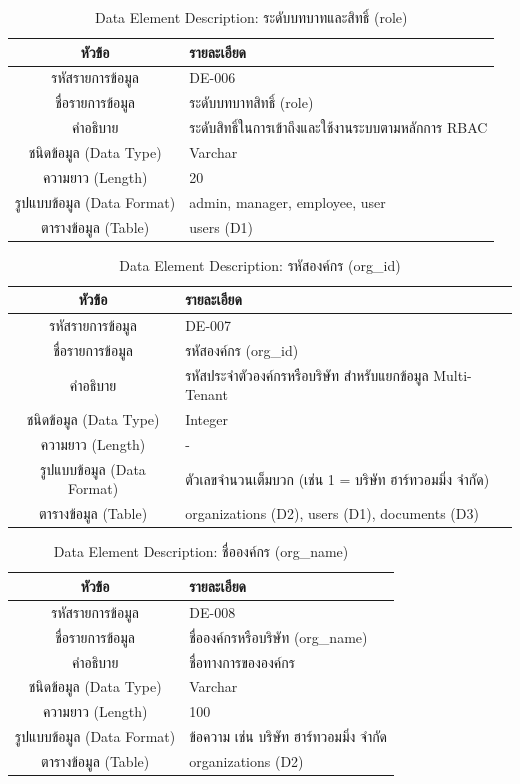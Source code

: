 \begin{table}[htbp]
\centering
\caption{Data Element Description: ระดับบทบาทและสิทธิ์ (role)}
\label{tab3:de_role}
\begin{tabularx}{\textwidth}{| c | L |}
\hline
\textbf{หัวข้อ} & \textbf{รายละเอียด} \\ \hline
รหัสรายการข้อมูล & DE-006 \\ \hline
ชื่อรายการข้อมูล & ระดับบทบาทสิทธิ์ (role) \\ \hline
คำอธิบาย & ระดับสิทธิ์ในการเข้าถึงและใช้งานระบบตามหลักการ RBAC \\ \hline
ชนิดข้อมูล (Data Type) & Varchar \\ \hline
ความยาว (Length) & 20 \\ \hline
รูปแบบข้อมูล (Data Format) & admin, manager, employee, user \\ \hline
ตารางข้อมูล (Table) & users (D1) \\ \hline
\end{tabularx}
\end{table}

\begin{table}[htbp]
\centering
\caption{Data Element Description: รหัสองค์กร (org\_id)}
\label{tab3:de_org_id}
\begin{tabularx}{\textwidth}{| c | L |}
\hline
\textbf{หัวข้อ} & \textbf{รายละเอียด} \\ \hline
รหัสรายการข้อมูล & DE-007 \\ \hline
ชื่อรายการข้อมูล & รหัสองค์กร (org\_id) \\ \hline
คำอธิบาย & รหัสประจำตัวองค์กรหรือบริษัท สำหรับแยกข้อมูล Multi-Tenant \\ \hline
ชนิดข้อมูล (Data Type) & Integer \\ \hline
ความยาว (Length) & - \\ \hline
รูปแบบข้อมูล (Data Format) & ตัวเลขจำนวนเต็มบวก (เช่น 1 = บริษัท ฮาร์ทวอมมิ่ง จำกัด) \\ \hline
ตารางข้อมูล (Table) & organizations (D2), users (D1), documents (D3) \\ \hline
\end{tabularx}
\end{table}

\begin{table}[htbp]
\centering
\caption{Data Element Description: ชื่อองค์กร (org\_name)}
\label{tab3:de_org_name}
\begin{tabularx}{\textwidth}{| c | L |}
\hline
\textbf{หัวข้อ} & \textbf{รายละเอียด} \\ \hline
รหัสรายการข้อมูล & DE-008 \\ \hline
ชื่อรายการข้อมูล & ชื่อองค์กรหรือบริษัท (org\_name) \\ \hline
คำอธิบาย & ชื่อทางการขององค์กร \\ \hline
ชนิดข้อมูล (Data Type) & Varchar \\ \hline
ความยาว (Length) & 100 \\ \hline
รูปแบบข้อมูล (Data Format) & ข้อความ เช่น บริษัท ฮาร์ทวอมมิ่ง จำกัด \\ \hline
ตารางข้อมูล (Table) & organizations (D2) \\ \hline
\end{tabularx}
\end{table}

